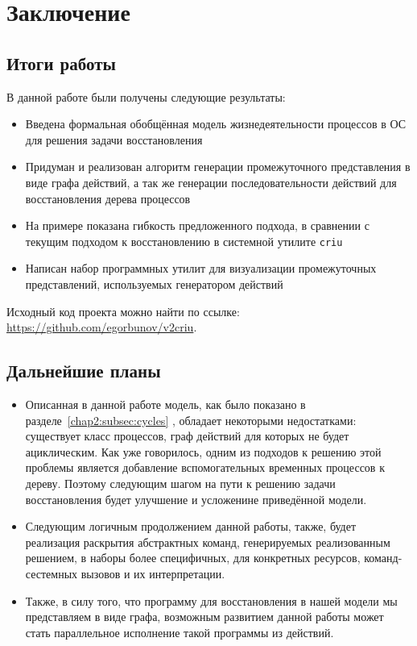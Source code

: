 

\chapter{Заключение}

\section{Итоги работы}

В данной работе были получены следующие результаты:

\begin{itemize}
	\item Введена формальная обобщённая модель жизнедеятельности процессов в ОС для решения задачи восстановления
	\item Придуман и реализован алгоритм генерации промежуточного представления в виде графа действий, а так
	же генерации последовательности действий для восстановления дерева процессов
	\item На примере показана гибкость предложенного подхода, в сравнении с текущим подходом к восстановлению в системной утилите \texttt{criu}
	\item Написан набор программных утилит для визуализации промежуточных представлений, используемых генератором действий
\end{itemize}

Исходный код проекта можно найти по ссылке: \url{https://github.com/egorbunov/v2criu}.

\section{Дальнейшие планы}

\begin{itemize}
	\item Описанная в данной работе модель, как было показано в разделе~\ref{chap2:subsec:cycles}
	, обладает некоторыми недостатками: существует класс процессов, граф действий для которых не 
	будет ациклическим. Как уже говорилось, одним из подходов к решению 
	этой проблемы является добавление вспомогательных временных процессов к дереву. Поэтому
	следующим шагом на пути к решению задачи восстановления будет улучшение и усложенине приведённой модели.
	\item Следующим логичным продолжением данной работы, также, будет реализация раскрытия абстрактных команд, генерируемых реализованным решением, в наборы более специфичных, для конкретных ресурсов, команд-сестемных вызовов и их интерпретации.
	\item Также, в силу того, что программу для восстановления в нашей модели мы представляем в виде графа, возможным развитием данной работы может стать параллельное исполнение такой программы из действий.
\end{itemize}
